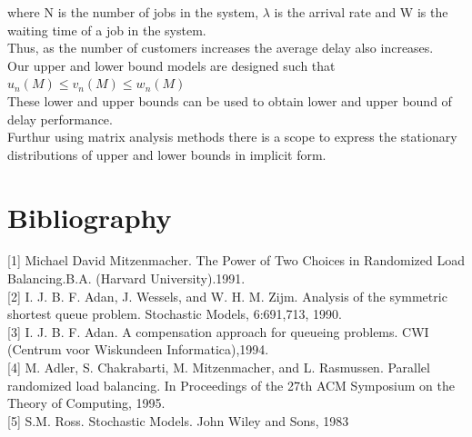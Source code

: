 \documentclass[a4paper,english,12pt]{article}
\begin{document}
where N is the number of jobs in the system, $\lambda$ is the arrival rate and W is the waiting time of a job in the system.\\
Thus, as the number of customers increases the average delay also increases.\\
Our upper and lower bound models are designed such that 
$u_n(M) \le v_n(M) \le w_n(M)$\\
These lower and upper  bounds can be used to obtain lower and upper bound of delay performance.\\
Furthur using matrix analysis methods there is a scope to express the stationary distributions of upper and lower bounds in implicit form.\\


\section{Bibliography}

[1] Michael David Mitzenmacher. The Power of Two Choices in Randomized Load Balancing.B.A. (Harvard University).1991.\\

[2] I. J. B. F. Adan, J. Wessels, and W. H. M. Zijm. Analysis of the symmetric shortest queue problem. Stochastic Models, 6:691,713, 1990.\\

[3] I. J. B. F. Adan. A compensation approach for queueing problems. CWI (Centrum voor Wiskundeen Informatica),1994.\\

[4] M. Adler, S. Chakrabarti, M. Mitzenmacher, and L. Rasmussen. Parallel randomized load balancing. In Proceedings of the 27th ACM Symposium on the Theory of Computing, 1995.\\

[5] S.M. Ross. Stochastic Models. John Wiley and Sons, 1983\\
\end{document}
